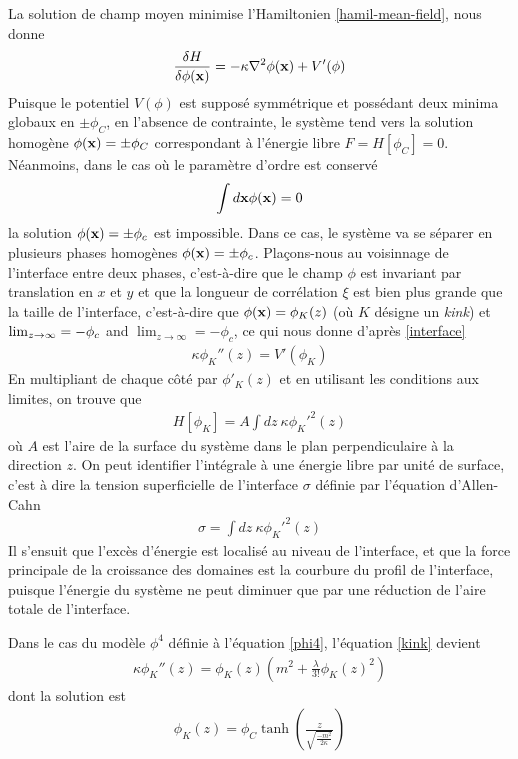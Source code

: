 La solution de champ moyen minimise l'Hamiltonien \ref{hamil-mean-field},  nous donne
\begin{align}
    \frac{\delta H}{\delta \phi({\bf x})} = -\kappa \nabla^2 \phi({\bf x}) + V'(\phi)
    \label{interface}
\end{align}
Puisque le potentiel $V(\phi)$ est supposé symmétrique et possédant deux minima globaux en $\pm \phi_C$, en l'absence de contrainte, le système tend vers la solution homogène $\phi({\bf x}) = \pm \phi_C$ correspondant à l'énergie libre $F=H[\phi_C]=0$. Néanmoins, dans le cas où le paramètre d'ordre est conservé
\begin{align}
    \int d {\bf x} \phi({\bf x})=0
\end{align}
la solution $\phi({\bf x})=\pm \phi_c$ est impossible. Dans ce cas, le système va se séparer en plusieurs phases homogènes $\phi({\bf x})= \pm \phi_c$. 
Plaçons-nous au voisinnage de l'interface entre deux phases, c'est-à-dire que le champ $\phi$ est invariant par translation en $x$ et $y$ et que la longueur de corrélation $\xi$ est bien plus grande que la taille de l'interface, c'est-à-dire que $\phi({\bf x}) = \phi_K(z)$ (où $K$ désigne un \textit{kink}) et $\lim_{z\to\-\infty}=-\phi_c$ and  $\lim_{z\to\infty}=-\phi_c$, ce qui nous donne d'après \ref{interface}
\begin{align}
    \kappa \phi_K''(z) =  V'(\phi_K)
    \label{kink}
\end{align}
En multipliant de chaque côté par $\phi'_K(z)$ et en utilisant les conditions aux limites, on trouve que 
\begin{align}
    H[\phi_K]=  A\int dz\ \kappa \phi_K'^2(z)
\end{align}
où $A$ est l'aire de la surface du système dans le plan perpendiculaire à la direction $z$. On peut identifier l'intégrale à une énergie libre par unité de surface, c'est à dire la tension superficielle de l'interface $\sigma$ définie par l'équation d'Allen-Cahn
\begin{align}
    \sigma=  \int dz\ \kappa \phi_K'^2(z)
    \label{tension-superficielle}
\end{align}
Il s'ensuit que l'excès d'énergie est localisé au niveau de l'interface, et que la force principale de la croissance des domaines est la courbure du profil de l'interface, puisque l'énergie du système ne peut diminuer que par une réduction de l'aire totale de l'interface. 

Dans le cas du modèle $\phi^4$ définie à l'équation \ref{phi4}, l'équation \ref{kink} devient
\begin{align}
    \kappa \phi_K''(z) = \phi_K(z) \left( m^2 + \frac{\lambda}{3!} \phi_K(z) ^2 \right)
       \label{eq-interface-glauber}
\end{align}
dont la solution est
\begin{align}
    \phi_K(z) = \phi_C \tanh \left( \frac{z}{\sqrt{\frac{-m^2}{2 \kappa}}} \right)
       \label{profil-interface-glauber}    
\end{align}


